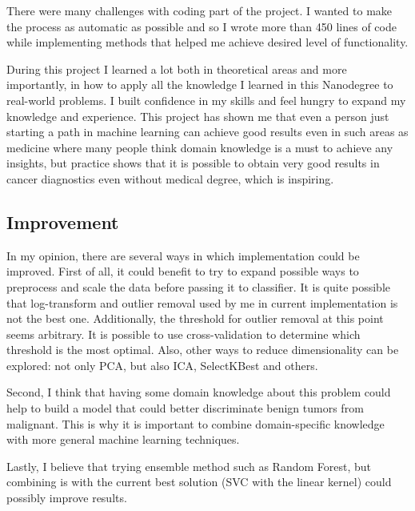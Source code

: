 \documentclass[10pt, a4paper]{article}
\begin{document}
There were many challenges with coding part of the project. I wanted to make the process as automatic as possible and so I wrote more than 450 lines of code while implementing methods that helped me achieve desired level of functionality.

During this project I learned a lot both in theoretical areas and more importantly, in how to apply all the knowledge I learned in this Nanodegree to real-world problems. I built confidence in my skills and feel hungry to expand my knowledge and experience. This project has shown me that even a person just starting a path in machine learning can achieve good results even in such areas as medicine where many people think domain knowledge is a must to achieve any insights, but practice shows that it is possible to obtain very good results in cancer diagnostics even without medical degree, which is inspiring.

\subsection{Improvement}

In my opinion, there are several ways in which implementation could be improved. First of all, it could benefit to try to expand possible ways to preprocess and scale the data before passing it to classifier. It is quite possible that log-transform and outlier removal used by me in current implementation is not the best one. Additionally, the threshold for outlier removal at this point seems arbitrary. It is possible to use cross-validation to determine which threshold is the most optimal. Also, other ways to reduce dimensionality can be explored: not only PCA, but also ICA, SelectKBest and others.

Second, I think that having some domain knowledge about this problem could help to build a model that could better discriminate benign tumors from malignant. This is why it is important to combine domain-specific knowledge with more general machine learning techniques.

Lastly, I believe that trying ensemble method such as Random Forest, but combining is with the current best solution (SVC with the linear kernel) could possibly improve results.

\pagebreak
\end{document}
